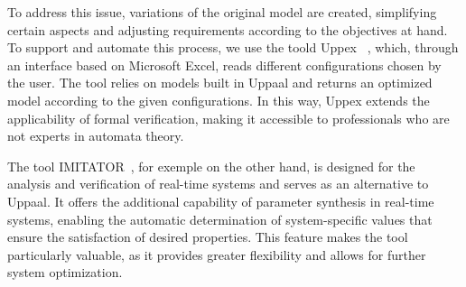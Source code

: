 To address this issue, variations of the original model are created, simplifying certain aspects and adjusting requirements according to the objectives at hand. To support and automate this process, we use the toold Uppex ~\cite{uppex,uppex-railway}, which, through an interface based on Microsoft Excel, reads different configurations chosen by the user. The tool relies on models built in Uppaal and returns an optimized model according to the given configurations. In this way, Uppex extends the applicability of formal verification, making it accessible to professionals who are not experts in automata theory.

The tool IMITATOR~\cite{citacao3}, for exemple on the other hand, is designed for the analysis and verification of real-time systems and serves as an alternative to Uppaal. It offers the additional capability of parameter synthesis in real-time systems, enabling the automatic determination of system-specific values that ensure the satisfaction of desired properties. This feature makes the tool particularly valuable, as it provides greater flexibility and allows for further system optimization.





